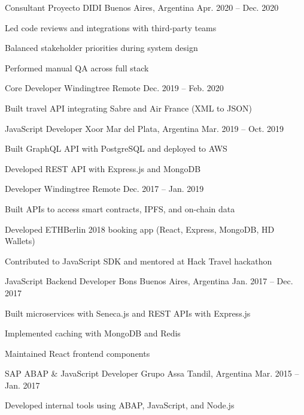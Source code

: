 \begin{cventries}
\cventry
{Consultant} %
{Proyecto DIDI} %
{Buenos Aires, Argentina} %
{Apr. 2020 – Dec. 2020}
{
\begin{cvitems}
\item {Led code reviews and integrations with third-party teams}
\item {Balanced stakeholder priorities during system design}
\item {Performed manual QA across full stack}
\end{cvitems}
}

\cventry
{Core Developer} %
{Windingtree} %
{Remote} %
{Dec. 2019 – Feb. 2020}
{
\begin{cvitems}
\item {Built travel API integrating Sabre and Air France (XML to JSON)}
\end{cvitems}
}

\cventry
{JavaScript Developer} %
{Xoor} %
{Mar del Plata, Argentina} %
{Mar. 2019 – Oct. 2019}
{
\begin{cvitems}
\item {Built GraphQL API with PostgreSQL and deployed to AWS}
\item {Developed REST API with Express.js and MongoDB}
\end{cvitems}
}

\cventry
{Developer} %
{Windingtree} %
{Remote} %
{Dec. 2017 – Jan. 2019}
{
\begin{cvitems}
\item {Built APIs to access smart contracts, IPFS, and on-chain data}
\item {Developed ETHBerlin 2018 booking app (React, Express, MongoDB, HD Wallets)}
\item {Contributed to JavaScript SDK and mentored at Hack Travel hackathon}
\end{cvitems}
}

\cventry
{JavaScript Backend Developer} %
{Bons} %
{Buenos Aires, Argentina} %
{Jan. 2017 – Dec. 2017}
{
\begin{cvitems}
\item {Built microservices with Seneca.js and REST APIs with Express.js}
\item {Implemented caching with MongoDB and Redis}
\item {Maintained React frontend components}
\end{cvitems}
}

\cventry
{SAP ABAP \& JavaScript Developer} %
{Grupo Assa} %
{Tandil, Argentina} %
{Mar. 2015 – Jan. 2017}
{
\begin{cvitems}
\item {Developed internal tools using ABAP, JavaScript, and Node.js}
\end{cvitems}
}

\end{cventries}
